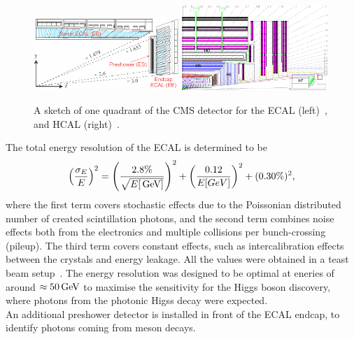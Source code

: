 \begin{figure}[tbp]
 \centering
 \includegraphics[width=0.49\textwidth]{figures/general/ecal}
 \includegraphics[width=0.49\textwidth]{figures/general/hcal}
 \caption{A sketch of one quadrant of the CMS detector for the ECAL (left)~\cite{ECALPicture}, and HCAL (right)~\cite{CMS}.}
 \label{fig:etaPlaneCMS}
\end{figure}
The total energy resolution of the ECAL is determined to be
\begin{equation}
 \left(\frac{\sigma_E}{E}\right)^2=\left(\frac{2.8\%}{\sqrt{E[\,\text{Ge\hspace{-.08em}V}]}}\right)^2 + \left(\frac{0.12}{E[GeV]}\right)^2 + (0.30\%)^2,
\end{equation}
where the first term covers stochastic effects due to the Poissonian distributed number of created scintillation photons, and the second term combines noise effects both from the electronics and multiple collisions per bunch-crossing (pileup). The third term covers constant effects, such as intercalibration effects between the crystals and energy leakage. All the values were obtained in a teast beam setup~\cite{ECALRes}. The energy resolution was designed to be optimal at eneries of around $\approx50\,\text{Ge\hspace{-.08em}V}$ to maximise the sensitivity for the Higgs boson discovery, where photons from the photonic Higss decay were expected.\\
An additional preshower detector is installed in front of the ECAL endcap, to identify photons coming from meson decays.

